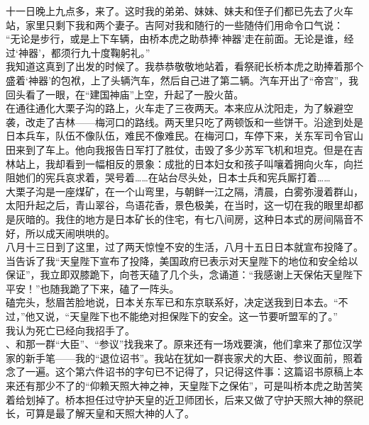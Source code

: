 十一日晚上九点多，来了。这时我的弟弟、妹妹、妹夫和侄子们都已先去了火车站，家里只剩下我和两个妻子。吉阿对我和随行的一些随侍们用命令口气说：\\

“无论是步行，或是上下车辆，由桥本虎之助恭捧‘神器’走在前面。无论是谁，经过‘神器’，都须行九十度鞠躬礼。”\\

我知道这真到了出发的时候了。我恭恭敬敬地站着，看祭祀长桥本虎之助捧着那个盛着‘神器’的包袱，上了头辆汽车，然后自己进了第二辆。汽车开出了“帝宫”，我回头看了一眼，在“建国神庙”上空，升起了一股火苗。\\

在通往通化大栗子沟的路上，火车走了三夜两天。本来应从沈阳走，为了躲避空袭，改走了吉林——梅河口的路线。两天里只吃了两顿饭和一些饼干。沿途到处是日本兵车，队伍不像队伍，难民不像难民。在梅河口，车停下来，关东军司令官山田来到了车上。他向我报告日军打了胜仗，击毁了多少苏军飞机和坦克。但是在吉林站上，我却看到一幅相反的景象：成批的日本妇女和孩子叫嚷着拥向火车，向拦阻她们的宪兵哀求着，哭号着……在站台尽头处，日本士兵和宪兵厮打着……\\

大栗子沟是一座煤矿，在一个山弯里，与朝鲜一江之隔，清晨，白雾弥漫着群山，太阳升起之后，青山翠谷，鸟语花香，景色极美，在当时，这一切在我的眼里却都是灰暗的。我住的地方是日本矿长的住宅，有七八间房，这种日本式的房间隔音不好，所以成天闹哄哄的。\\

八月十三日到了这里，过了两天惊惶不安的生活，八月十五日日本就宣布投降了。\\

当告诉了我“天皇陛下宣布了投降，美国政府已表示对天皇陛下的地位和安全给以保证”，我立即双膝跪下，向苍天磕了几个头，念诵道：“我感谢上天保佑天皇陛下平安！”也随我跪了下来，磕了一阵头。\\

磕完头，愁眉苦脸地说，日本关东军已和东京联系好，决定送我到日本去。“不过，”他又说，“天皇陛下也不能绝对担保陛下的安全。这一节要听盟军的了。”\\

我认为死亡已经向我招手了。\\

、和那一群“大臣”、“参议”找我来了。原来还有一场戏要演，他们拿来了那位汉学家的新手笔——我的“退位诏书”。我站在犹如一群丧家犬的大臣、参议面前，照着念了一遍。这个第六件诏书的字句已不记得了，只记得这件事：这篇诏书原稿上本来还有那少不了的“仰赖天照大神之神，天皇陛下之保佑”，可是叫桥本虎之助苦笑着给划掉了。桥本担任过守护天皇的近卫师团长，后来又做了守护天照大神的祭祀长，可算是最了解天皇和天照大神的人了。\\

